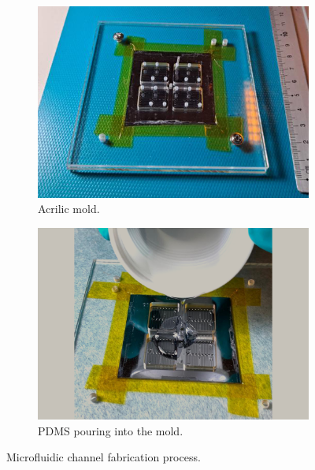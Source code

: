 \begin{figure}[!ht]
    \centering
    \begin{subfigure}[b]{.475\linewidth}
        \centering
        \includegraphics[width=\linewidth]{images/appendix_b/mold.png}
        \caption{Acrilic mold.}
        \label{figure:pdms-mold}
    \end{subfigure}
    \hfill
    \centering
    \begin{subfigure}[b]{.475\linewidth}
        \centering
        \includegraphics[width=\linewidth]{images/appendix_b/pour.png}
        \caption{PDMS pouring into the mold.}
        \label{figure:pdms-pouring}
    \end{subfigure}

    \caption{Microfluidic channel fabrication process.}
    \label{figure:pdms}
\end{figure}

